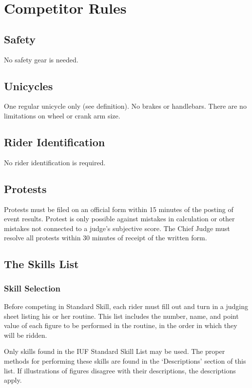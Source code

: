 \chapter{Competitor Rules}

\section{Safety}

No safety gear is needed.

\section{Unicycles}

One regular unicycle only (see definition).
No brakes or handlebars.
There are no limitations on wheel or crank arm size.

\section{Rider Identification}

No rider identification is required.

\section{Protests}

Protests must be filed on an official form within 15 minutes of the posting of event results.
Protest is only possible against mistakes in calculation or other mistakes not connected to a judge's subjective score.
The Chief Judge must resolve all protests within 30 minutes of receipt of the written form.

\section{The Skills List}

\subsection{Skill Selection}
Before competing in Standard Skill, each rider must fill out and turn in a judging sheet listing his or her routine.
This list includes the number, name, and point value of each figure to be performed in the routine, in the order in which they will be ridden.

Only skills found in the IUF Standard Skill List may be used.
The proper methods for performing these skills are found in the `Descriptions' section of this list.
If illustrations of figures disagree with their descriptions, the descriptions apply.

